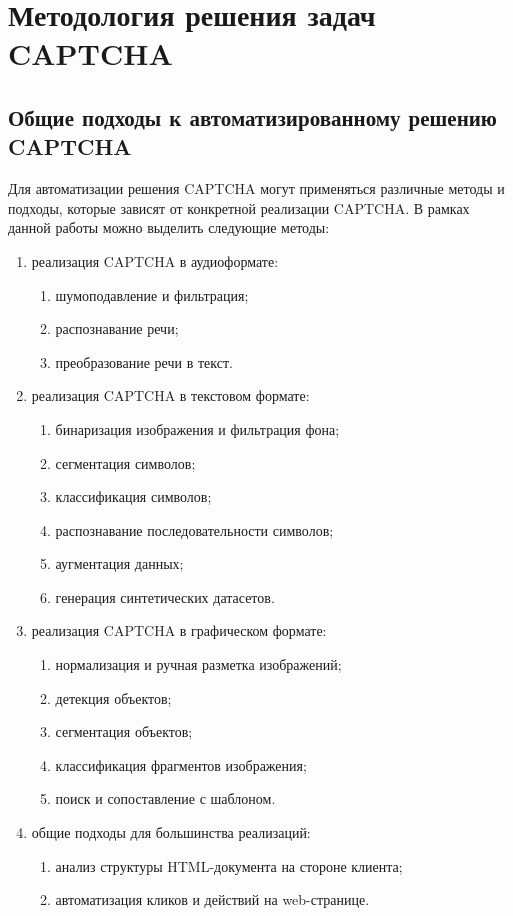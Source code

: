 \chapter{Методология решения задач CAPTCHA}

\section{Общие подходы к автоматизированному решению CAPTCHA}

Для автоматизации решения CAPTCHA могут применяться различные методы и подходы, 
которые зависят от конкретной реализации CAPTCHA. В рамках данной работы можно 
выделить следующие методы:

\begin{enumerate}
    \item реализация CAPTCHA в аудиоформате:
    \begin{enumerate}
        \item шумоподавление и фильтрация;
        \item распознавание речи;
        \item преобразование речи в текст.
    \end{enumerate}
    \item реализация CAPTCHA в текстовом формате:
    \begin{enumerate}
        \item бинаризация изображения и фильтрация фона;
        \item сегментация символов;
        \item классификация символов;
        \item распознавание последовательности символов;
        \item аугментация данных;
        \item генерация синтетических датасетов.
    \end{enumerate}
    \item реализация CAPTCHA в графическом формате:
    \begin{enumerate}
        \item нормализация и ручная разметка изображений;
        \item детекция объектов;
        \item сегментация объектов;
        \item классификация фрагментов изображения;
        \item поиск и сопоставление с шаблоном. 
    \end{enumerate}
    \item общие подходы для большинства реализаций:
    \begin{enumerate}
        \item анализ структуры HTML-документа на стороне клиента;
        \item автоматизация кликов и действий на web-странице.
    \end{enumerate}
\end{enumerate}

